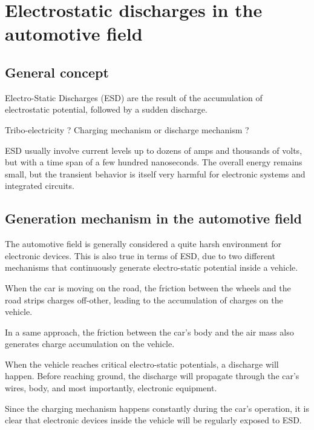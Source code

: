 \section{Electrostatic discharges in the automotive field}
\subsection{General concept}
Electro-Static Discharges (ESD) are the result of the accumulation of electrostatic potential,
followed by a sudden discharge.

Tribo-electricity ? Charging mechanism or discharge mechanism ?

ESD usually involve current levels up to dozens of amps and thousands of volts, but with a time span of a few hundred nanoseconds.
The overall energy remains small, but the transient behavior is itself very harmful for electronic systems and integrated circuits.

\subsection{Generation mechanism in the automotive field}
The automotive field is generally considered a quite harsh environment for electronic devices.
This is also true in terms of ESD, due to two different mechanisms that continuously generate electro-static potential inside a vehicle.

When the car is moving on the road, the friction between the wheels and the road strips charges off-other, leading to the accumulation of
charges on the vehicle.

In a same approach, the friction between the car's body and the air mass also generates charge accumulation on the vehicle.

When the vehicle reaches critical electro-static potentials, a discharge will happen. Before reaching ground, the discharge will propagate through
the car's wires, body, and most importantly, electronic equipment.

Since the charging mechanism happens constantly during the car's operation, it is clear that electronic devices inside the vehicle will be regularly
exposed to ESD.
